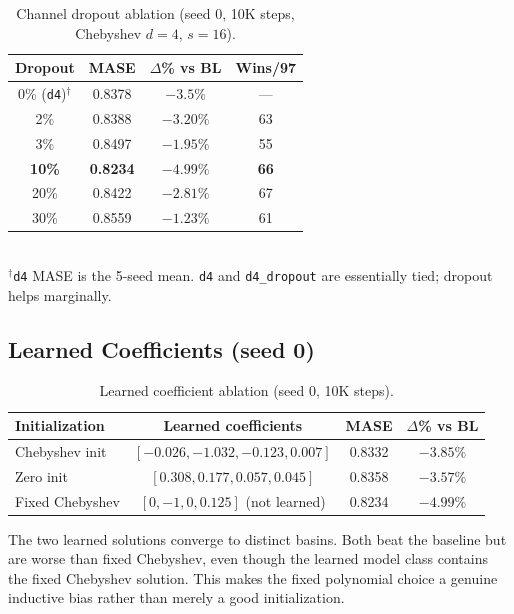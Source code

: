 \documentclass{article}
\begin{document}
\begin{table}[H]
\centering
\caption{Channel dropout ablation (seed 0, 10K steps, Chebyshev $d=4$, $s=16$).}
\small
\begin{tabular}{cccc}
\toprule
\textbf{Dropout} & \textbf{MASE} & \textbf{$\Delta$\% vs BL} & \textbf{Wins/97} \\
\midrule
0\% (\texttt{d4})$^\dagger$ & 0.8378 & $-3.5\%$ & --- \\
2\% & 0.8388 & $-3.20\%$ & 63 \\
3\% & 0.8497 & $-1.95\%$ & 55 \\
\textbf{10\%} & \textbf{0.8234} & $\mathbf{-4.99\%}$ & \textbf{66} \\
20\% & 0.8422 & $-2.81\%$ & 67 \\
30\% & 0.8559 & $-1.23\%$ & 61 \\
\bottomrule
\end{tabular}
\\[2pt]
{\footnotesize $^\dagger$\texttt{d4} MASE is the 5-seed mean. \texttt{d4} and \texttt{d4\_dropout} are essentially tied; dropout helps marginally.}
\end{table}

\subsection{Learned Coefficients (seed 0)}

\begin{table}[H]
\centering
\caption{Learned coefficient ablation (seed 0, 10K steps).}
\small
\begin{tabular}{lccc}
\toprule
\textbf{Initialization} & \textbf{Learned coefficients} & \textbf{MASE} & \textbf{$\Delta$\% vs BL} \\
\midrule
Chebyshev init & $[-0.026, -1.032, -0.123, 0.007]$ & 0.8332 & $-3.85\%$ \\
Zero init & $[0.308, 0.177, 0.057, 0.045]$ & 0.8358 & $-3.57\%$ \\
Fixed Chebyshev & $[0, -1, 0, 0.125]$ (not learned) & 0.8234 & $-4.99\%$ \\
\bottomrule
\end{tabular}
\end{table}

The two learned solutions converge to distinct basins. Both beat the baseline but are worse than fixed Chebyshev, even though the learned model class contains the fixed Chebyshev solution. This makes the fixed polynomial choice a genuine inductive bias rather than merely a good initialization.
\end{document}
